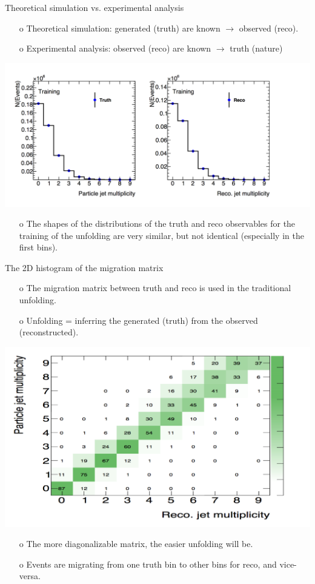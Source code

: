 \begin{frame} {Theoretical simulation vs. experimental analysis}
\begin{enumerate}
\item[o] Theoretical simulation: generated (truth) are known $\rightarrow$ observed (reco).
\item[o] Experimental analysis: observed (reco) are known $\rightarrow$ truth (nature)
\end{enumerate}
\centering
\includegraphics[height=0.5\textheight]{./plots/jet_multiplicity.png}
\begin{enumerate}
\item[o] The shapes of the distributions of the truth and reco observables for the training of the unfolding are very similar, but not identical (especially in the first bins). 
\end{enumerate}
\end{frame}
\clearpage


\begin{frame} {The 2D histogram of the migration matrix}
\begin{enumerate}
\item[o] The migration matrix between truth and reco is used in the traditional unfolding.
\item[o] Unfolding = inferring the generated (truth) from the observed (reconstructed).
\end{enumerate}
\centering
\includegraphics[height=0.5\textheight]{./plots/jet_multiplicity_migration_matrix.png}
\begin{enumerate}
\item[o] The more diagonalizable matrix, the easier unfolding will be.
\item[o] Events are migrating from one truth bin to other bins for reco, and vice-versa.
\end{enumerate}
\end{frame}
\clearpage


